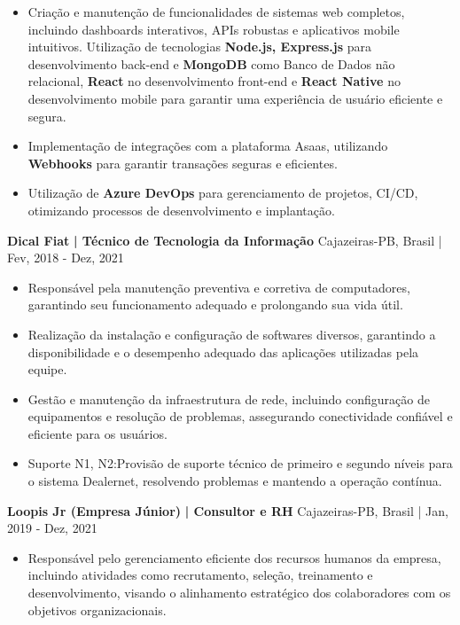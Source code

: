 \documentclass[a4paper]{article}
\begin{document}
\begin{itemize} \itemsep -3pt
    \item Criação e manutenção de funcionalidades de sistemas web completos, incluindo dashboards interativos, APIs robustas e aplicativos mobile intuitivos.
          Utilização de tecnologias \textbf{Node.js, Express.js} para desenvolvimento back-end e \textbf{MongoDB} como Banco de Dados não relacional, \textbf{React} no desenvolvimento front-end e \textbf{React Native} no desenvolvimento mobile
          para garantir uma experiência de usuário eficiente e segura.
    \item  Implementação de integrações com a plataforma Asaas, utilizando \textbf{Webhooks} para garantir transações seguras e eficientes.
    \item Utilização de \textbf{Azure DevOps} para gerenciamento de projetos, CI/CD, otimizando processos de desenvolvimento e implantação.


\end{itemize}
\textbf{Dical Fiat}\textbf{ | Técnico de Tecnologia da Informação} \hfill Cajazeiras-PB, Brasil | Fev, 2018 - Dez, 2021\\
\vspace{-3mm}
\begin{itemize} \itemsep -3pt
    \item  Responsável pela manutenção preventiva e corretiva de computadores, garantindo seu funcionamento adequado e prolongando sua vida útil.
    \item  Realização da instalação e configuração de softwares diversos, garantindo a disponibilidade e o desempenho adequado das aplicações utilizadas pela equipe.
    \item  Gestão e manutenção da infraestrutura de rede, incluindo configuração de equipamentos e resolução de problemas, assegurando conectividade confiável e eficiente para os usuários.
    \item Suporte N1, N2:Provisão de suporte técnico de primeiro e segundo níveis para o sistema Dealernet, resolvendo problemas e mantendo a operação contínua.
\end{itemize}
\textbf{Loopis Jr (Empresa Júnior)}\textbf{ | Consultor e RH} \hfill Cajazeiras-PB, Brasil | Jan, 2019 - Dez, 2021\\
\vspace{-3mm}
\begin{itemize} \itemsep -3pt
    \item  Responsável pelo gerenciamento eficiente dos recursos humanos da empresa, incluindo atividades como recrutamento, seleção, treinamento e desenvolvimento, visando o alinhamento estratégico dos colaboradores com os objetivos organizacionais.

\end{itemize}
\end{document}
